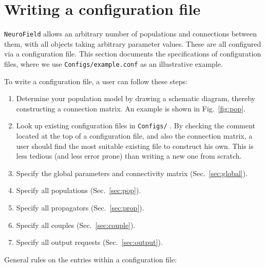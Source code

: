 \documentclass[12pt,a4paper]{article}
\newcommand{\type}[1]{ {\small\small\tt #1} }
\newcommand{\NF}[0]{ \type{NeuroField}}
\begin{document}
\section{Writing a configuration file}
\label{sec:config}

\NF allows an arbitrary number of populations and connections between them, with all objects taking arbitrary parameter values. These are all configured via a configuration file. This section documents the specifications of configuration files, where we use \type{Configs/example.conf} as an illustrative example.

To write a configuration file, a user can follow these steps:
\begin{enumerate}
\item Determine your population model by drawing a schematic diagram, thereby constructing a connection matrix. An example is shown in Fig.~\ref{fig:pop}.
\item Look up existing configuration files in \type{Configs/}. By checking the comment located at the top of a configuration file, and also the connection matrix, a user should find the most suitable existing file to construct his own. This is less tedious (and less error prone) than writing a new one from scratch.
\item Specify the global parameters and connectivity matrix (Sec.~\ref{sec:global}).
\item Specify all populations (Sec.~\ref{sec:pop}).
\item Specify all propagators (Sec.~\ref{sec:prop}).
\item Specify all couples (Sec.~\ref{sec:couple}).
\item Specify all output requests (Sec.~\ref{sec:output}).
\end{enumerate}

General rules on the entries within a configuration file:
\end{document}

